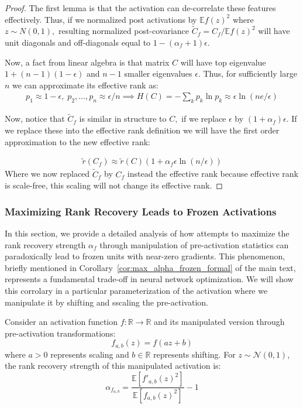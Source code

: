 \documentclass{article}
\newcommand{\E}{\mathbb{E}}
\numberwithin{figure}{section}
\begin{document}
\begin{proof}
    The first lemma is that the activation can de-correlate these features effectively. 
Thus, if we normalized post activations by $\E f(z)^2 $ where $z\sim N(0,1),$ resulting normalized post-covariance $\widetilde{C}_f = C_f / \E f(z)^2$ will have unit diagonals and off-diagonals equal to $1-(\alpha_f + 1) \epsilon.$ 

Now, a fact from linear algebra is that matrix $C$ will have top eigenvalue $1+(n-1)(1-\epsilon)$ and $n-1$ smaller eigenvalues $\epsilon. $ Thus, for sufficiently large $n$ we can approximate its effective rank as:
\begin{align*}
    p_1 \approx 1-\epsilon,\;  
    p_2,\dots, p_n \approx \epsilon/n \implies H(C)=-\sum_k p_k\ln p_k \approx \epsilon\ln(ne/\epsilon)
\end{align*}

Now, notice that $\widetilde{C}_f$ is similar in structure to $C,$ if we replace $\epsilon$ by $(1+\alpha_f)\epsilon. $ If we replace these into the effective rank definition we will have the first order approximation to the new effective rank:

\begin{align*}
    \tilde{r}(C_f)\approx \tilde{r}(C)(1 + \alpha_f \epsilon \ln(n/\epsilon) )
\end{align*}
Where we now replaced $\widetilde{C}_f$ by $C_f$ instead the effective rank because effective rank is scale-free, this scaling will not change its effective rank.  

\end{proof}


\subsubsection{Maximizing Rank Recovery Leads to Frozen Activations}
\label{app:max_rank_frozen}

In this section, we provide a detailed analysis of how attempts to maximize the rank recovery strength $\alpha_f$ through manipulation of pre-activation statistics can paradoxically lead to frozen units with near-zero gradients. This phenomenon, briefly mentioned in Corollary~\ref{cor:max_alpha_frozen_formal} of the main text, represents a fundamental trade-off in neural network optimization. We will show this corrolary in a particular parameterization of the activation where we manipulate it by shifting and sscaling the pre-activation. 

Consider an  activation function $f: \mathbb{R} \to \mathbb{R}$ and its manipulated version through pre-activation transformations:
$$f_{a,b}(z) = f(az + b)$$
where $a > 0$ represents scaling and $b \in \mathbb{R}$ represents shifting. For $z \sim \mathcal{N}(0,1)$, the rank recovery strength of this manipulated activation is:
$$\alpha_{f_{a,b}} = \frac{\mathbb{E}[f'_{a,b}(z)^2]}{\mathbb{E}[f_{a,b}(z)^2]} - 1$$
\end{document}
